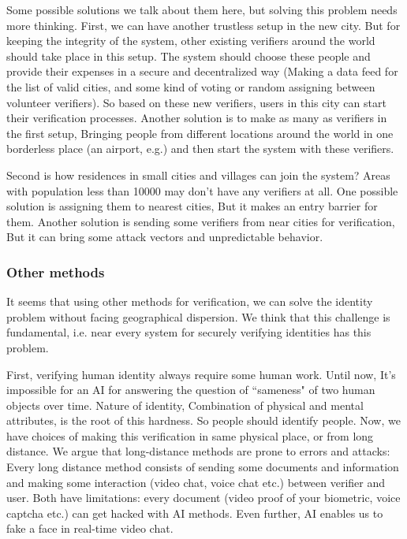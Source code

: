 \documentclass[conference]{IEEEtran}
\begin{document}
Some possible solutions we talk about them here, but solving this problem needs more thinking. First, we can have another trustless setup in the new city. But for keeping the integrity of the system, other existing verifiers around the world should take place in this setup. The system should choose these people and provide their expenses in a secure and decentralized way (Making a data feed for the list of valid cities, and some kind of voting or random assigning between volunteer verifiers). So based on these new verifiers, users in this city can start their verification processes. Another solution is to make as many as verifiers in the first setup, Bringing people from different locations around the world in one borderless place (an airport, e.g.) and then start the system with these verifiers. 


Second is how residences in small cities and villages can join the system? Areas with population less than 10000  may don't have any verifiers at all. One possible solution is assigning them to nearest cities, But it makes an entry barrier for them. Another solution is sending some verifiers from near cities for verification, But it can bring some attack vectors and unpredictable behavior. 

\subsubsection*{Other methods}
It seems that using other methods for verification, we can solve the identity problem without facing geographical dispersion. We think that this challenge is fundamental, i.e. near every system for securely verifying identities has this problem.


First, verifying human identity always require some human work. Until now, It's impossible for an AI for answering the question of ``sameness" of two human objects over time. Nature of identity, Combination of physical and mental attributes, is the root of this hardness. So people should identify people. Now, we have choices of making this verification in same physical place, or from long distance. We argue that long-distance methods are prone to errors and attacks: Every long distance method consists of sending some documents and information and making some interaction (video chat, voice chat etc.) between verifier and user. Both have limitations: every document (video proof of your biometric, voice captcha etc.) can get hacked with AI methods. Even further, AI enables us to fake a face in real-time video chat.
\end{document}
